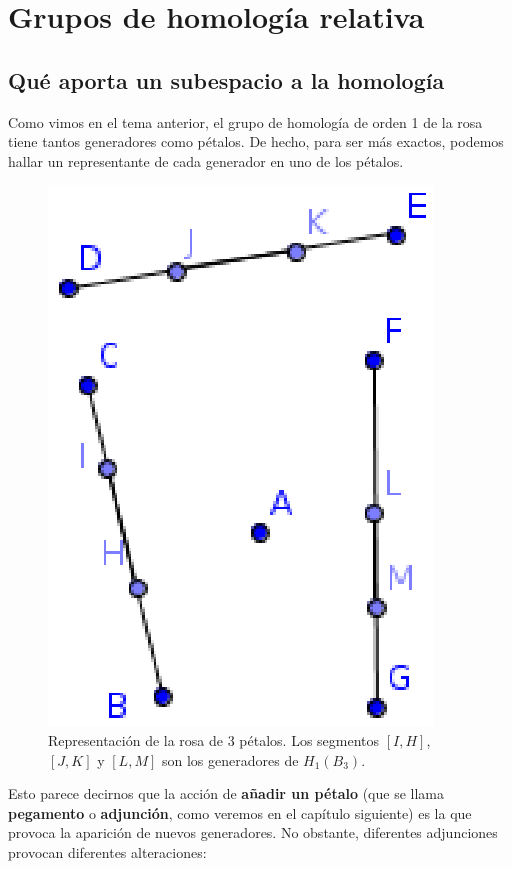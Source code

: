 \chapter{Grupos de homología relativa}
\section{Qué aporta un subespacio a la homología}
Como vimos en el tema anterior, el grupo de homología de orden 1 de la rosa tiene tantos generadores como pétalos. De hecho, para ser más exactos, podemos hallar un representante de cada generador en uno de los pétalos.

\begin{figure}[h]
\centering
\includegraphics[scale=0.75]{Figures/Gen3Rosa.eps}
\caption{Representación de la rosa de 3 pétalos. Los segmentos $[I,H]$, $[J,K]$ y $[L,M]$ son los generadores de $H_1(B_3)$.}
\end{figure}

Esto parece decirnos que la acción de \textbf{añadir un pétalo} (que se llama \textbf{pegamento} o \textbf{adjunción}, como veremos en el capítulo siguiente) es la que provoca la aparición de nuevos generadores. No obstante, diferentes adjunciones provocan diferentes alteraciones:


